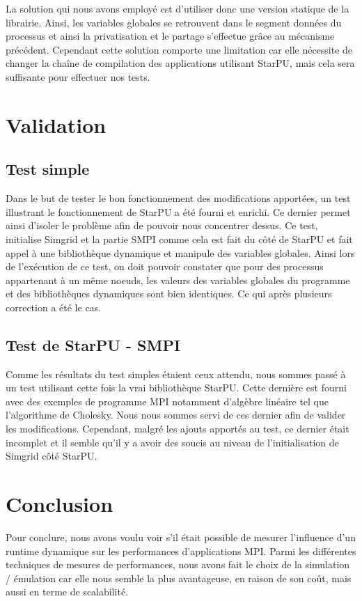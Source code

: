 \documentclass[smallextended]{svjour3}
\begin{document}
La solution qui nous avons employé est d'utiliser donc une version
statique de la librairie. Ainsi, les variables globales se
retrouvent dans le segment données du processus et ainsi la
privatisation et le partage s'effectue grâce au mécanisme
précédent. Cependant cette solution comporte une limitation car elle
nécessite de changer la chaîne de compilation des applications
utilisant StarPU, mais cela sera suffisante pour effectuer nos tests. 

\section{Validation}
\label{sec-6}
\subsection{Test simple}
\label{sec-6-1}
Dans le but de tester le bon fonctionnement des modifications
apportées, un test illustrant le fonctionnement de StarPU a été
fourni et enrichi. Ce dernier permet ainsi d'isoler le problème
afin de pouvoir nous concentrer dessus. Ce test, initialise Simgrid
et la partie SMPI comme cela est fait du côté de StarPU et fait
appel à une bibliothèque dynamique et manipule des variables
globales. Ainsi lors de l'exécution de ce test, on doit pouvoir
constater que pour des processus appartenant à un même noeuds, les
valeurs des variables globales du programme et des bibliothèques
dynamiques sont bien identiques. Ce qui après plusieurs correction
a été le cas.  
\subsection{Test de StarPU - SMPI}
\label{sec-6-2}
Comme les résultats du test simples étaient ceux attendu, nous
sommes passé à un test utilisant cette fois la vrai bibliothèque
StarPU. Cette dernière est fourni avec des exemples de programme MPI
notamment d'algèbre linéaire tel que l'algorithme de Cholesky. Nous
nous sommes servi de ces dernier afin de valider les
modifications. Cependant, malgré les ajouts apportés au test, ce 
dernier était incomplet et il semble qu'il y a avoir des soucis au
niveau de  l'initialisation de Simgrid côté StarPU.

\section{Conclusion}
\label{sec-7}
Pour conclure, nous avons voulu voir s'il était possible de mesurer
l'influence d'un runtime dynamique sur les performances
d'applications MPI. Parmi les différentes techniques de mesures de
performances, nous avons fait le choix de la simulation / émulation
car elle nous semble la plus avantageuse, en raison de son coût,
mais aussi en terme de scalabilité.  
\end{document}
